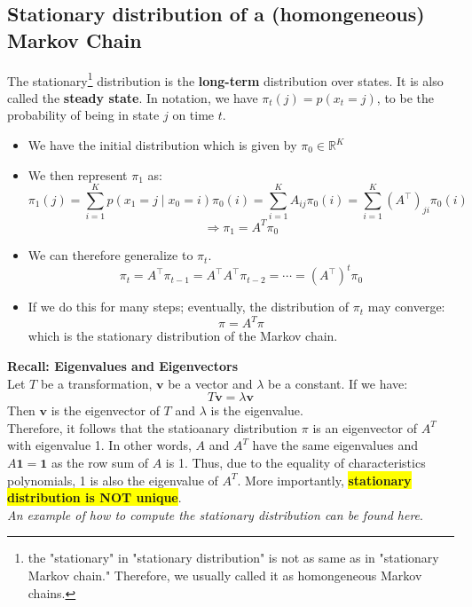 \subsection{Stationary distribution of a (homongeneous) Markov Chain}
The stationary\footnote{the "stationary" in "stationary distribution" is not as same as in "stationary Markov chain." Therefore, we usually called it as homongeneous Markov chains.} distribution is the \textbf{long-term} distribution over states. It is also called the \textbf{steady state}. In notation, we have $\pi_t(j)=p(x_t=j)$, to be the probability of being in state $j$ on time $t$.\\
\begin{itemize}
    \item We have the initial distribution which is given by $\pi_0\in\mathbb{R}^{K}$
    \item We then represent $\pi_1$ as:
    $$\pi_1(j)=\sum_{i=1}^K p\left(x_1=j \mid x_0=i\right) \pi_0(i)=\sum_{i=1}^K A_{i j} \pi_0(i)=\sum_{i=1}^K\left(A^{\top}\right)_{j i} \pi_0(i)$$
    $$\Rightarrow \pi_1=A^T\pi_0$$
    \item We can therefore generalize to $\pi_t$.
    $$\pi_t=A^{\top} \pi_{t-1}=A^{\top} A^{\top} \pi_{t-2}=\cdots=\left(A^{\top}\right)^t \pi_0$$
    \item If we do this for many steps; eventually, the distribution of $\pi_t$ may converge:
    $$\pi=A^T\pi$$
    which is the stationary distribution of the Markov chain.
\end{itemize}

\textbf{Recall: Eigenvalues and Eigenvectors}\\
Let $T$ be a transformation, $\mathbf{v}$ be a vector and $\lambda$ be a constant. If we have:
$$T\mathbf{v}=\lambda\mathbf{v}$$
Then $\mathbf{v}$ is the eigenvector of $T$ and $\lambda$ is the eigenvalue.\\

Therefore, it follows that the statioanary distribution $\pi$ is an eigenvector of $A^T$ with eigenvalue 1. In other words, $A$ and $A^T$ have the same eigenvalues and $A\mathbf{1}=\mathbf{1}$ as the row sum of $A$ is 1. Thus, due to the equality of characteristics polynomials, 1 is also the eigenvalue of $A^T$. More importantly, \colorbox{yellow}{\textbf{stationary distribution is NOT unique}}.\\

\textit{An example of how to compute the stationary distribution can be found here}.

